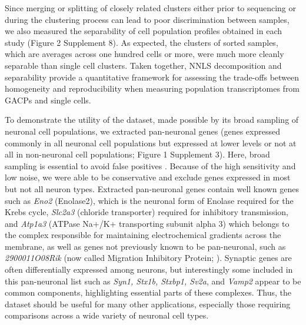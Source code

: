 Since merging or splitting of closely related clusters either prior to sequencing or during the clustering process can lead to poor discrimination between samples, we also measured the separability of cell population profiles obtained in each study (Figure 2 Supplement 8). As expected, the clusters of sorted samples, which are averages across one hundred cells or more, were much more cleanly separable than single cell clusters. Taken together, NNLS decomposition and separability provide a quantitative framework for assessing the trade-offs between homogeneity and reproducibility when measuring population transcriptomes from GACPs and single cells. 

To demonstrate the utility of the dataset, made possible by its broad sampling of neuronal cell populations, we extracted pan-neuronal genes (genes expressed commonly in all neuronal cell populations but expressed at lower levels or not at all in non-neuronal cell populations; Figure 1 Supplement 3). Here, broad sampling is essential to avoid false positives \citep{Zhang_2014,Mo_2015,Stefanakis_2015}. Because of the high sensitivity and low noise, we were able to be conservative and exclude genes expressed in most but not all neuron types. Extracted pan-neuronal genes contain well known genes such as \textit{Eno2} (Enolase2), which is the neuronal form of Enolase required for the Krebs cycle, \textit{Slc2a3} (chloride transporter) required for inhibitory transmission, and \textit{Atp1a3} (ATPase Na+/K+ transporting subunit alpha 3) which belongs to the complex responsible for maintaining electrochemical gradients across the membrane, as well as genes not previously known to be pan-neuronal, such as \textit{2900011O08Rik} (now called Migration Inhibitory Protein; \cite{Zhang_2014a}). Synaptic genes are often differentially expressed among neurons, but interestingly some included in this pan-neuronal list such as \textit{Syn1, Stx1b, Stxbp1, Sv2a}, and \textit{Vamp2} appear to be common components, highlighting essential parts of these complexes. Thus, the dataset should be useful for many other applications, especially those requiring comparisons across a wide variety of neuronal cell types. 

